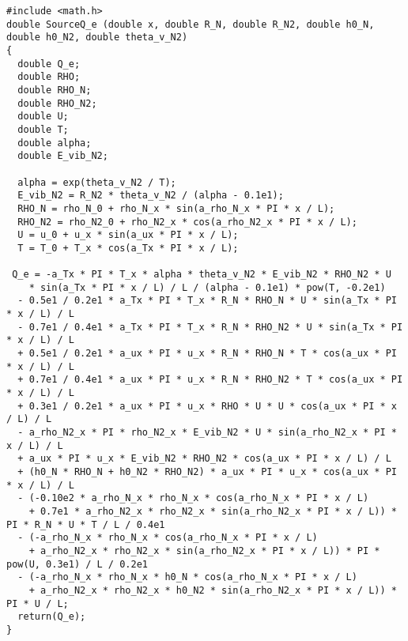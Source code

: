 \documentclass[10pt]{article}
\begin{document}
\begin{small}
\begin{verbatim}
#include <math.h>
double SourceQ_e (double x, double R_N, double R_N2, double h0_N, double h0_N2, double theta_v_N2)
{
  double Q_e;
  double RHO;
  double RHO_N;
  double RHO_N2;
  double U;
  double T;
  double alpha;
  double E_vib_N2;

  alpha = exp(theta_v_N2 / T);
  E_vib_N2 = R_N2 * theta_v_N2 / (alpha - 0.1e1);
  RHO_N = rho_N_0 + rho_N_x * sin(a_rho_N_x * PI * x / L);
  RHO_N2 = rho_N2_0 + rho_N2_x * cos(a_rho_N2_x * PI * x / L);
  U = u_0 + u_x * sin(a_ux * PI * x / L);
  T = T_0 + T_x * cos(a_Tx * PI * x / L);

 Q_e = -a_Tx * PI * T_x * alpha * theta_v_N2 * E_vib_N2 * RHO_N2 * U
    * sin(a_Tx * PI * x / L) / L / (alpha - 0.1e1) * pow(T, -0.2e1)
  - 0.5e1 / 0.2e1 * a_Tx * PI * T_x * R_N * RHO_N * U * sin(a_Tx * PI * x / L) / L
  - 0.7e1 / 0.4e1 * a_Tx * PI * T_x * R_N * RHO_N2 * U * sin(a_Tx * PI * x / L) / L
  + 0.5e1 / 0.2e1 * a_ux * PI * u_x * R_N * RHO_N * T * cos(a_ux * PI * x / L) / L
  + 0.7e1 / 0.4e1 * a_ux * PI * u_x * R_N * RHO_N2 * T * cos(a_ux * PI * x / L) / L
  + 0.3e1 / 0.2e1 * a_ux * PI * u_x * RHO * U * U * cos(a_ux * PI * x / L) / L
  - a_rho_N2_x * PI * rho_N2_x * E_vib_N2 * U * sin(a_rho_N2_x * PI * x / L) / L
  + a_ux * PI * u_x * E_vib_N2 * RHO_N2 * cos(a_ux * PI * x / L) / L
  + (h0_N * RHO_N + h0_N2 * RHO_N2) * a_ux * PI * u_x * cos(a_ux * PI * x / L) / L
  - (-0.10e2 * a_rho_N_x * rho_N_x * cos(a_rho_N_x * PI * x / L)
    + 0.7e1 * a_rho_N2_x * rho_N2_x * sin(a_rho_N2_x * PI * x / L)) * PI * R_N * U * T / L / 0.4e1
  - (-a_rho_N_x * rho_N_x * cos(a_rho_N_x * PI * x / L)
    + a_rho_N2_x * rho_N2_x * sin(a_rho_N2_x * PI * x / L)) * PI * pow(U, 0.3e1) / L / 0.2e1
  - (-a_rho_N_x * rho_N_x * h0_N * cos(a_rho_N_x * PI * x / L)
    + a_rho_N2_x * rho_N2_x * h0_N2 * sin(a_rho_N2_x * PI * x / L)) * PI * U / L;
  return(Q_e);
}
\end{verbatim}
 \end{small}
\end{document}
